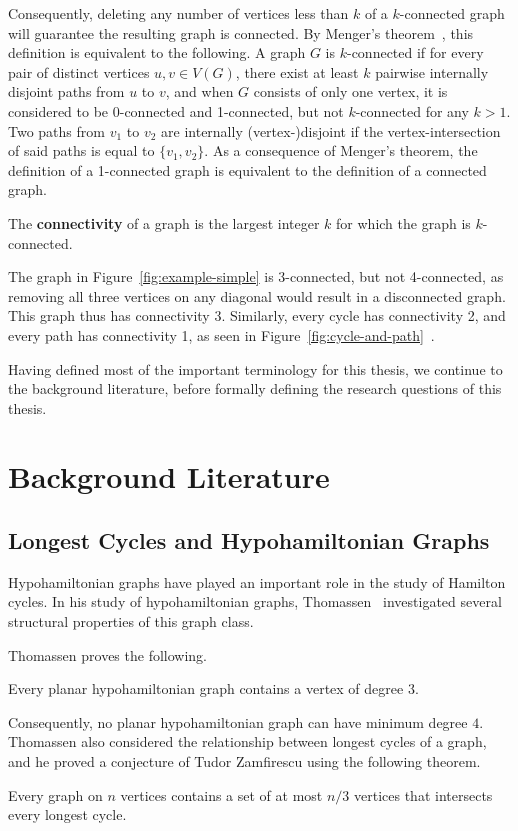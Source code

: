 Consequently, deleting any number of vertices less than $k$ of a $k$-connected graph will guarantee the resulting graph is connected. By Menger's theorem~\cite{book:bondy-definitions}, this definition is equivalent to the following. A graph $G$ is $k$-connected if for every pair of distinct vertices $u,v \in V(G)$, there exist at least $k$ pairwise internally disjoint paths from $u$ to $v$, and when $G$ consists of only one vertex, it is considered to be 0-connected and 1-connected, but not $k$-connected for any $k > 1$. Two paths from $v_1$ to $v_2$ are internally (vertex-)disjoint if the vertex-intersection of said paths is equal to $\{v_1, v_2\}$. As a consequence of Menger's theorem, the definition of a 1-connected graph is equivalent to the definition of a connected graph.

\begin{definition}[Connectivity]
  The \textbf{connectivity} of a graph is the largest integer $k$ for which the graph is $k$-connected.
\end{definition}

The graph in Figure~\ref{fig:example-simple} is 3-connected, but not 4-connected, as removing all three vertices on any diagonal would result in a disconnected graph. This graph thus has connectivity 3. Similarly, every cycle has connectivity 2, and every path has connectivity 1, as seen in Figure~\ref{fig:cycle-and-path}~\cite{book:bondy-definitions}.

Having defined most of the important terminology for this thesis, we continue to the background literature, before formally defining the research questions of this thesis.

\section{Background Literature}

\subsection{Longest Cycles and Hypohamiltonian Graphs}
\label{sec:thomassen-theorems}

Hypohamiltonian graphs have played an important role in the study of Hamilton cycles. In his study of hypohamiltonian graphs, Thomassen~\cite{article:thomassen} investigated several structural properties of this graph class.

Thomassen proves the following.
\begin{theorem}
  \label{theorem:thomassen-planar-hypo-minimal}
  Every planar hypohamiltonian graph contains a vertex of degree $3$.
\end{theorem}
Consequently, no planar hypohamiltonian graph can have minimum degree $4$. Thomassen also considered the relationship between longest cycles of a graph, and he proved a conjecture of Tudor Zamfirescu using the following theorem.
\begin{theorem}
  \label{theorem:thomassen-longest-intersect}
  Every graph on $n$ vertices contains a set of at most $n/3$ vertices that intersects every longest cycle.
\end{theorem}


